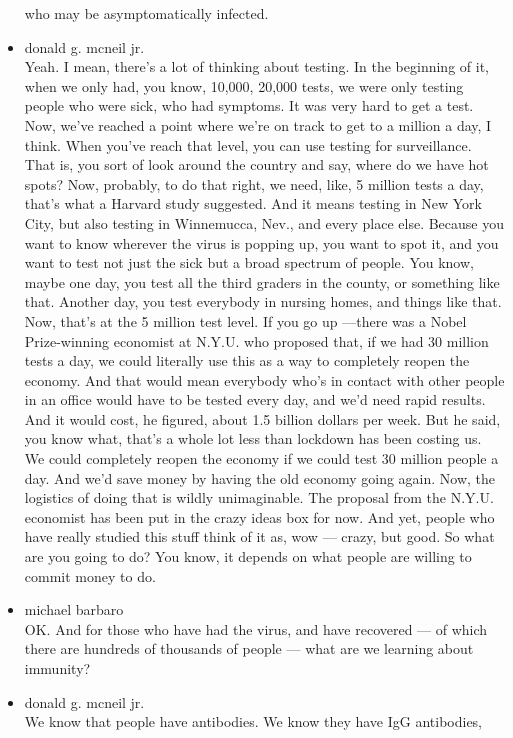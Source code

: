 \begin{itemize}
  who may be asymptomatically infected.
\item
  donald g. mcneil jr.\\
  Yeah. I mean, there's a lot of thinking about testing. In the
  beginning of it, when we only had, you know, 10,000, 20,000 tests, we
  were only testing people who were sick, who had symptoms. It was very
  hard to get a test. Now, we've reached a point where we're on track to
  get to a million a day, I think. When you've reach that level, you can
  use testing for surveillance. That is, you sort of look around the
  country and say, where do we have hot spots? Now, probably, to do that
  right, we need, like, 5 million tests a day, that's what a Harvard
  study suggested. And it means testing in New York City, but also
  testing in Winnemucca, Nev., and every place else. Because you want to
  know wherever the virus is popping up, you want to spot it, and you
  want to test not just the sick but a broad spectrum of people. You
  know, maybe one day, you test all the third graders in the county, or
  something like that. Another day, you test everybody in nursing homes,
  and things like that. Now, that's at the 5 million test level. If you
  go up ---there was a Nobel Prize-winning economist at N.Y.U. who
  proposed that, if we had 30 million tests a day, we could literally
  use this as a way to completely reopen the economy. And that would
  mean everybody who's in contact with other people in an office would
  have to be tested every day, and we'd need rapid results. And it would
  cost, he figured, about 1.5 billion dollars per week. But he said, you
  know what, that's a whole lot less than lockdown has been costing us.
  We could completely reopen the economy if we could test 30 million
  people a day. And we'd save money by having the old economy going
  again. Now, the logistics of doing that is wildly unimaginable. The
  proposal from the N.Y.U. economist has been put in the crazy ideas box
  for now. And yet, people who have really studied this stuff think of
  it as, wow --- crazy, but good. So what are you going to do? You know,
  it depends on what people are willing to commit money to do.
\item
  michael barbaro\\
  OK. And for those who have had the virus, and have recovered --- of
  which there are hundreds of thousands of people --- what are we
  learning about immunity?
\item
  donald g. mcneil jr.\\
  We know that people have antibodies. We know they have IgG antibodies,

\end{itemize}
